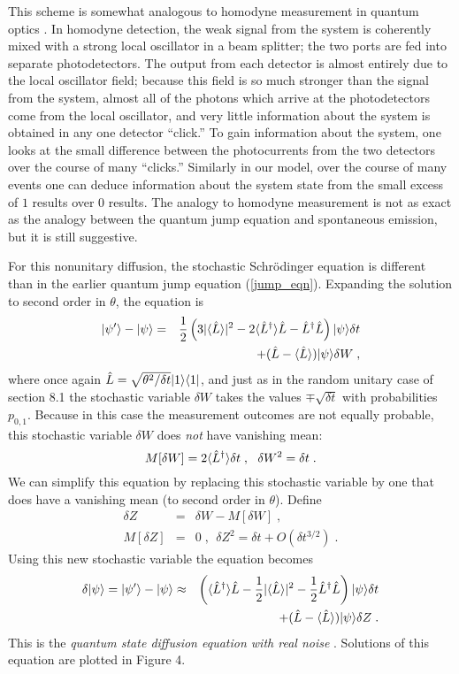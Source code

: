 This scheme is somewhat analogous to homodyne measurement in quantum optics
\cite{Carmichael,Wiseman}.  In homodyne detection, the weak signal from the
system is coherently mixed with a strong local oscillator in a beam splitter;
the two ports are fed into separate photodetectors.  The output from each
detector is almost entirely due to the local oscillator field; because
this field is so much stronger than the signal from the system, almost
all of the photons which arrive at the photodetectors come from the local
oscillator, and very little information about the system is obtained
in any one detector ``click.''  To gain information about the system, one
looks at the small difference between the photocurrents from the two detectors
over the course of many ``clicks.''  Similarly in our model,
over the course of many events one can deduce information
about the system state from the small excess of $1$ results over $0$ results.
The analogy to homodyne measurement is not as exact as the analogy between
the quantum jump equation and spontaneous emission, but it is still
suggestive.

For this nonunitary diffusion, the stochastic Schr\"odinger equation
is different than in the earlier quantum jump equation (\ref{jump_eqn}).
Expanding the solution to second order in $\theta$, the equation is
\begin{eqnarray}
{| \psi' \rangle} - {| \psi \rangle} &=&
  {1\over2}\left(3|{\langle {\hat L} \rangle}|^2 - 2{\langle {\hat L^\dagger} \rangle}{\hat L}
  - {\hat L^\dagger}{\hat L}\right){| \psi \rangle} \delta t \nonumber\\
&& + ({\hat L} - {\langle {\hat L} \rangle}){| \psi \rangle} \delta W \;,
\end{eqnarray}
where once again ${\hat L} = \sqrt{\theta^2/\delta t}{| 1 \rangle}{\langle 1 |}$, and
just as in the random unitary case of section 8.1 the stochastic
variable $\delta W$ takes the values $\mp \sqrt{\delta t}$ with 
probabilities $p_{0,1}$.
Because in this case the measurement outcomes are not equally probable,
this stochastic variable $\delta W$ does {\it not} have vanishing mean:
\begin{equation}
M[\delta W] = 2\expect{\Ldag}\delta t \;, \ \ \delta W^2 = \delta t \;.
\end{equation}
We can simplify this equation by replacing this stochastic variable by
one that does have a vanishing mean (to second order in $\theta$).  Define
\begin{eqnarray}
\delta Z &=& \delta W - M[\delta W] \;, \nonumber\\
M[\delta Z] &=& 0 \;, \ \ \delta Z^2 = \delta t + O(\delta t^{3/2}) \;.
\end{eqnarray}
Using this new stochastic variable the equation becomes
\begin{eqnarray}
\delta{| \psi \rangle} = {| \psi' \rangle} - {| \psi \rangle} &\approx& 
  \left( {\langle {\hat L^\dagger} \rangle}{\hat L} - {1\over2}|{\langle {\hat L} \rangle}|^2
  - {1\over2}{\hat L^\dagger}{\hat L}\right){| \psi \rangle} \delta t \nonumber\\
&& + ({\hat L} - {\langle {\hat L} \rangle}){| \psi \rangle} \delta Z \;.
\label{real_qsd}
\end{eqnarray}
This is the {\it quantum state diffusion equation with real noise}
\cite{Gisin1}.  Solutions of this equation are plotted in Figure 4.

